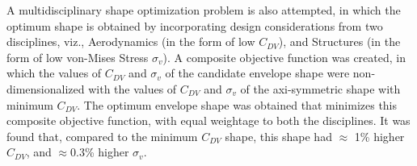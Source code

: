 \begin{Abstract}
A multidisciplinary shape optimization problem is also attempted, in which the optimum shape is obtained by incorporating design considerations from two disciplines, viz., Aerodynamics (in the form of low  $C_{DV}$), and Structures (in the form of low von-Mises Stress $\sigma_{v}$). A composite objective function was created, in which the values of  $C_{DV}$ and $\sigma_{v}$ of the candidate envelope shape were non-dimensionalized with the values of $C_{DV}$ and $\sigma_{v}$ of the axi-symmetric shape with minimum $C_{DV}$. The optimum envelope shape was obtained that minimizes this composite objective function, with equal weightage to both the disciplines. It was found that, compared to the minimum $C_{DV}$ shape, this shape had $\approx$ 1\% higher $C_{DV}$, and $\approx 0.3$\% higher $\sigma_{v}$.
\end{Abstract}
